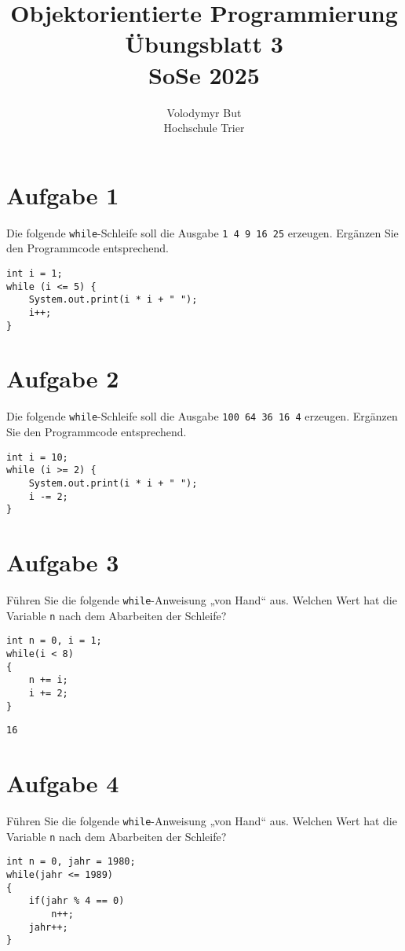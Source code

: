 \documentclass[10pt, oneside]{article}
\title{Objektorientierte Programmierung\\[15pt]\Large{Übungsblatt 3}\\[10pt]\Large{SoSe 2025}}
\author{Volodymyr But\\[10pt]Hochschule Trier}
\date{}
\begin{document}
\maketitle
\vspace{25px}

\section{Aufgabe 1}

Die folgende \verb|while|-Schleife soll die Ausgabe \verb|1 4 9 16 25| erzeugen.
Ergänzen Sie den Programmcode entsprechend.

\begin{verbatim}
int i = 1;
while (i <= 5) {
    System.out.print(i * i + " ");
    i++;
}
\end{verbatim}

\section{Aufgabe 2}

Die folgende \verb|while|-Schleife soll die Ausgabe \verb|100 64 36 16 4|
erzeugen. Ergänzen Sie den Programmcode entsprechend.

\begin{verbatim}
int i = 10;
while (i >= 2) {
    System.out.print(i * i + " ");
    i -= 2;
}
\end{verbatim}

\section{Aufgabe 3}

Führen Sie die folgende \verb|while|-Anweisung „von Hand“ aus. Welchen Wert hat die
Variable \verb|n| nach dem Abarbeiten der Schleife?

\begin{verbatim}
int n = 0, i = 1;
while(i < 8)
{
    n += i;
    i += 2;
}
\end{verbatim}

\verb|16|

\section{Aufgabe 4}

Führen Sie die folgende \verb|while|-Anweisung „von Hand“ aus. Welchen Wert hat die
Variable \verb|n| nach dem Abarbeiten der Schleife?

\begin{verbatim}
int n = 0, jahr = 1980;
while(jahr <= 1989)
{
    if(jahr % 4 == 0)
        n++;
    jahr++;
}
\end{verbatim}
\end{document}
